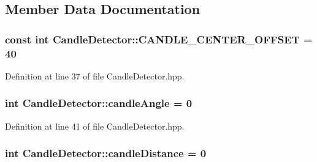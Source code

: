 \subsection{Member Data Documentation}
\hypertarget{classCandleDetector_a9920f067f44f9dc8aab6747699a244f7}{
\subsubsection[{C\-A\-N\-D\-L\-E\-\_\-\-C\-E\-N\-T\-E\-R\-\_\-\-O\-F\-F\-S\-E\-T}]{\setlength{\rightskip}{0pt plus 5cm}const int Candle\-Detector\-::\-C\-A\-N\-D\-L\-E\-\_\-\-C\-E\-N\-T\-E\-R\-\_\-\-O\-F\-F\-S\-E\-T = 40\hspace{0.3cm}{\ttfamily [private]}}}\label{classCandleDetector_a9920f067f44f9dc8aab6747699a244f7}


Definition at line 37 of file Candle\-Detector.\-hpp.

\hypertarget{classCandleDetector_a043c3f35890b36e187734a492f96f84c}{
\subsubsection[{candle\-Angle}]{\setlength{\rightskip}{0pt plus 5cm}int Candle\-Detector\-::candle\-Angle = 0\hspace{0.3cm}{\ttfamily [private]}}}\label{classCandleDetector_a043c3f35890b36e187734a492f96f84c}


Definition at line 41 of file Candle\-Detector.\-hpp.

\hypertarget{classCandleDetector_a3d4f2c951c77838bfc5c068b58cf9fda}{
\subsubsection[{candle\-Distance}]{\setlength{\rightskip}{0pt plus 5cm}int Candle\-Detector\-::candle\-Distance = 0\hspace{0.3cm}{\ttfamily [private]}}}\label{classCandleDetector_a3d4f2c951c77838bfc5c068b58cf9fda}


